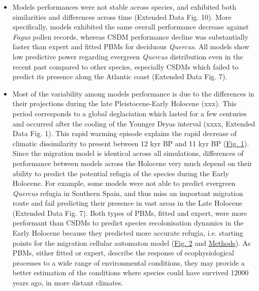 \documentclass[pdflatex, sn-nature]{sn-jnl}%
\begin{document}
\begin{itemize}
\item Models performances were not stable across species, and exhibited both similarities and differences across time (Extended Data Fig. 10). More specifically, models exhibited the same overall performance decrease against \emph{Fagus} pollen records, whereas CSDM performance decline was substantially faster than expert and fitted PBMs for deciduous \emph{Quercus}. All models show low predictive power regarding evergreen \emph{Quercus} distribution even in the recent past compared to other species, especially CSDMs which failed to predict its presence along the Atlantic coast (Extended Data Fig. 7).

\item Most of the variability among models performance is due to the differences in their projections during the late Pleistocene-Early Holocene (xxx). This period  corresponds to a global deglaciation which lasted for a few centuries and occurred after the cooling of the Younger Dryas interval  (xxxx, Extended Data Fig. 1). This rapid warming episode explains the rapid decrease of climatic dissimilarity to present between 12 kyr BP and 11 kyr BP (\hyperref[climatic_dissimilarity]{Fig. 1}). Since the migration model is identical across all simulations, differences of performance between models across the Holocene very much depend on their ability to predict the potential refugia of the species during the Early Holocene. For example, some models were not able to predict evergreen \emph{Quercus} refugia in Southern Spain, and thus miss an important migration route and fail predicting their presence in vast areas in the Late Holocene (Extended Data Fig. 7). Both types of PBMs, fitted and expert, were more performant than CSDMs to predict species recolonisation dynamics in the Early Holocene because they predicted more accurate refugia, i.e. starting points for the migration cellular automaton model (\hyperref[quercus_migration]{Fig. 2} and \hyperref[methods]{Methods}). 
As PBMs, either fitted or expert, describe the response of ecophysiological processes to a wide range of environmental conditions, they may provide a better estimation of the conditions where species could have survived 12000 years ago, in more distant climates. 

\end{itemize}
\end{document}
